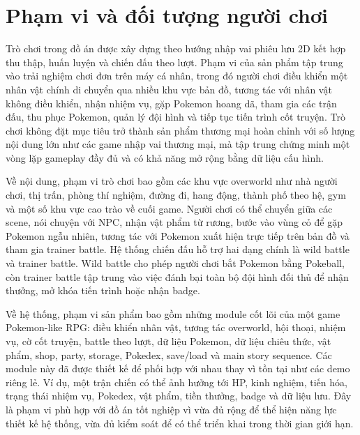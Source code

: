 
\section{Phạm vi và đối tượng người chơi}

Trò chơi trong đồ án được xây dựng theo hướng nhập vai phiêu lưu 2D kết hợp thu thập, huấn luyện và chiến đấu theo lượt. Phạm vi của sản phẩm tập trung vào trải nghiệm chơi đơn trên máy cá nhân, trong đó người chơi điều khiển một nhân vật chính di chuyển qua nhiều khu vực bản đồ, tương tác với nhân vật không điều khiển, nhận nhiệm vụ, gặp Pokemon hoang dã, tham gia các trận đấu, thu phục Pokemon, quản lý đội hình và tiếp tục tiến trình cốt truyện. Trò chơi không đặt mục tiêu trở thành sản phẩm thương mại hoàn chỉnh với số lượng nội dung lớn như các game nhập vai thương mại, mà tập trung chứng minh một vòng lặp gameplay đầy đủ và có khả năng mở rộng bằng dữ liệu cấu hình.

Về nội dung, phạm vi trò chơi bao gồm các khu vực overworld như nhà người chơi, thị trấn, phòng thí nghiệm, đường đi, hang động, thành phố theo hệ, gym và một số khu vực cao trào về cuối game. Người chơi có thể chuyển giữa các scene, nói chuyện với NPC, nhận vật phẩm từ rương, bước vào vùng cỏ để gặp Pokemon ngẫu nhiên, tương tác với Pokemon xuất hiện trực tiếp trên bản đồ và tham gia trainer battle. Hệ thống chiến đấu hỗ trợ hai dạng chính là wild battle và trainer battle. Wild battle cho phép người chơi bắt Pokemon bằng Pokeball, còn trainer battle tập trung vào việc đánh bại toàn bộ đội hình đối thủ để nhận thưởng, mở khóa tiến trình hoặc nhận badge.

Về hệ thống, phạm vi sản phẩm bao gồm những module cốt lõi của một game Pokemon-like RPG: điều khiển nhân vật, tương tác overworld, hội thoại, nhiệm vụ, cờ cốt truyện, battle theo lượt, dữ liệu Pokemon, dữ liệu chiêu thức, vật phẩm, shop, party, storage, Pokedex, save/load và main story sequence. Các module này đã được thiết kế để phối hợp với nhau thay vì tồn tại như các demo riêng lẻ. Ví dụ, một trận chiến có thể ảnh hưởng tới HP, kinh nghiệm, tiến hóa, trạng thái nhiệm vụ, Pokedex, vật phẩm, tiền thưởng, badge và dữ liệu lưu. Đây là phạm vi phù hợp với đồ án tốt nghiệp vì vừa đủ rộng để thể hiện năng lực thiết kế hệ thống, vừa đủ kiểm soát để có thể triển khai trong thời gian giới hạn.


